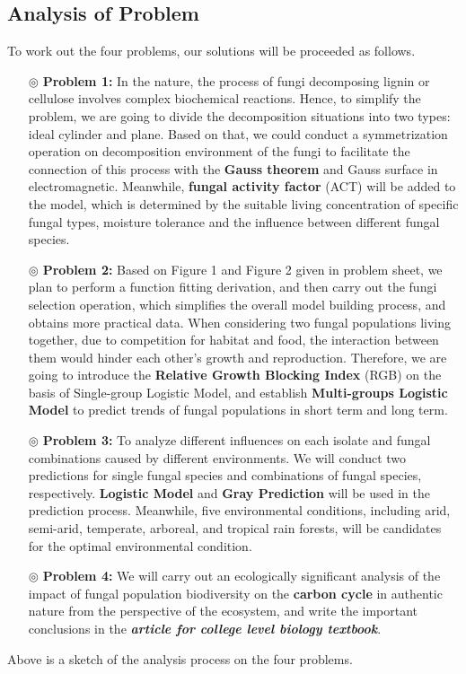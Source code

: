 \subsection{Analysis of Problem}
To work out the four problems, our solutions will be proceeded as follows.
\begin{itemize}
  \item[$\circledcirc$] \textbf{Problem 1:} In the nature, the process of fungi decomposing lignin or cellulose involves complex biochemical reactions. Hence, to simplify the problem, we are going to divide the decomposition situations into two types: ideal cylinder and plane. Based on that, we could conduct a symmetrization operation on decomposition environment of the fungi to facilitate the connection of this process with the \textbf{Gauss theorem} and Gauss surface in electromagnetic. Meanwhile, \textbf{fungal activity factor} (ACT) will be added to the model, which is determined by the suitable living concentration of specific fungal types, moisture tolerance and the influence between different fungal species.
  \item[$\circledcirc$] \textbf{Problem 2:} Based on Figure 1 and Figure 2 given in problem sheet, we plan to perform a function fitting derivation, and then carry out the fungi selection operation, which simplifies the overall model building process, and obtains more practical data. When considering two fungal populations living together, due to competition for habitat and food, the interaction between them would hinder each other's growth and reproduction. Therefore, we are going to introduce the \textbf{Relative Growth Blocking Index} (RGB) on the basis of Single-group Logistic Model, and establish \textbf{Multi-groups Logistic Model} to predict trends of fungal populations in short term and long term.
  \item[$\circledcirc$] \textbf{Problem 3:} To analyze different influences on each isolate and fungal combinations caused by different environments. We will conduct two predictions for single fungal species and combinations of fungal species, respectively. \textbf{Logistic Model} and \textbf{Gray Prediction} will be used in the prediction process. Meanwhile, five environmental conditions, including arid, semi-arid, temperate, arboreal, and tropical rain forests, will be candidates for the optimal environmental condition.
  \item[$\circledcirc$] \textbf{Problem 4:} We will carry out an ecologically significant analysis of the impact of fungal population biodiversity on the \textbf{carbon cycle} in authentic nature from the perspective of the ecosystem, and write the important conclusions in the \textbf{\textit{article for college level biology textbook}}.
\end{itemize}
\par
Above is a sketch of the analysis process on the four problems.